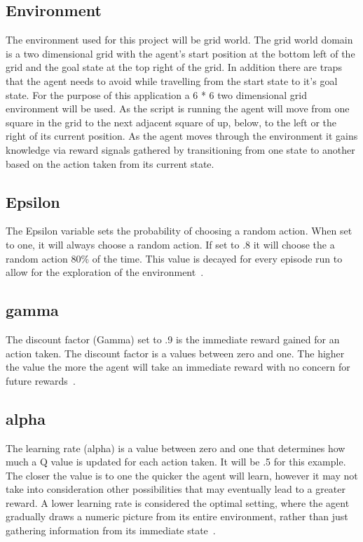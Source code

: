 \subsection{Environment}
The environment used for this project will be grid world. The grid world domain is a two dimensional grid with the agent's start position at the bottom left of the grid and the goal state at the top right of the grid. In addition there are traps that the agent needs to avoid while travelling from the start state to it's goal state.
For the purpose of this application a  6 * 6 two dimensional grid environment will be used. As the script is running the agent will move from one square in the grid to the next adjacent square of up, below, to the left or the right of its current position. As the agent moves through the environment it gains knowledge via reward signals gathered by transitioning from one state to another based on the action taken from its current state.
\subsection{Epsilon}
The Epsilon variable sets the probability of choosing a random action. When set to one, it will always choose a random action. If set to .8 it will choose the a random action 80\% of the time. This value is decayed for every episode run to allow for the exploration of the environment~\cite{LITTMAN1994157}.
\subsection{gamma}
The discount factor (Gamma) set to .9 is the immediate reward gained for an action taken. The discount factor is a values between zero and one. The higher the value the more the agent will take an immediate reward with no concern for future rewards~\cite{LITTMAN1994157}.
\subsection{alpha}
The learning rate (alpha) is a value between zero and one that determines how much a Q value is updated for each action taken. It will be .5 for this example. The closer the value is to one the quicker the agent will learn, however it may not take into consideration other possibilities that may eventually lead to a greater reward. A lower learning rate is considered the optimal setting, where the agent gradually draws a numeric picture from its entire environment, rather than just gathering information from its immediate state~\cite{LITTMAN1994157}. 

